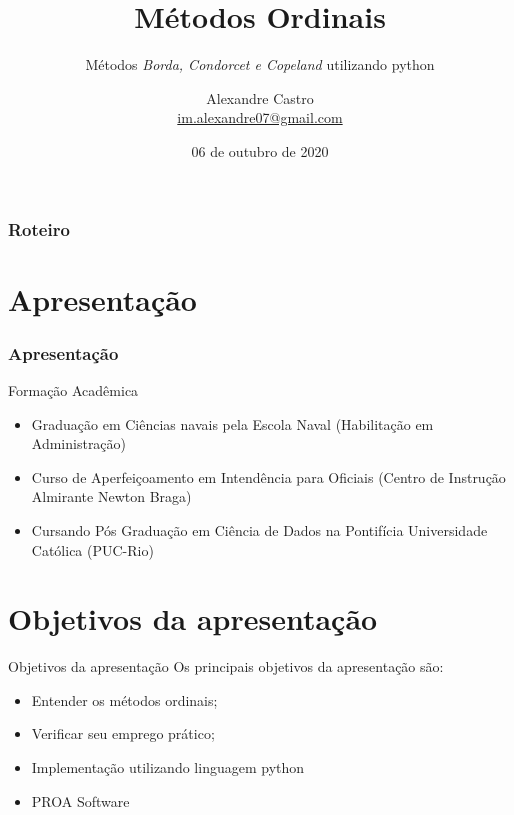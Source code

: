 \documentclass[aspectratio=169]{beamer}
\title[Métodos Ordinais]{Métodos Ordinais}
\subtitle{Métodos \textit{Borda, Condorcet e Copeland} utilizando python}
\begin{document}
\author[M. Alexandre P. C. Junior]{
    \begin{tabular}{c} 
        \Large
        Alexandre Castro\\
        \footnotesize \href{mailto:im.alexandre07@gmail.com}{im.alexandre07@gmail.com}
    \end{tabular}}


\date{06 de outubro de 2020}


\begin{frame}\maketitle\end{frame}


\begin{frame}
    \frametitle{Roteiro}
    \tableofcontents[pausesections]
\end{frame}

\section{Apresentação}
\begin{frame}
    \frametitle{Apresentação}
    Formação Acadêmica
    \begin{itemize}
        \item Graduação em Ciências navais pela Escola Naval (Habilitação em Administração)
        \item Curso de Aperfeiçoamento em Intendência para Oficiais (Centro de Instrução Almirante Newton Braga)
        \item Cursando Pós Graduação em Ciência de Dados na Pontifícia Universidade Católica (PUC-Rio)
    \end{itemize}

\end{frame}

\section{Objetivos da apresentação}
\begin{frame}{Objetivos da apresentação}
    Os principais objetivos da apresentação são:
    \begin{itemize}[<+- | uncover@+>]
        \item Entender os métodos ordinais;
        \item Verificar seu emprego prático; 
        \item \alert{Implementação utilizando linguagem python}
        \item \alert{PROA Software}
    \end{itemize}
\end{frame}
\end{document}
